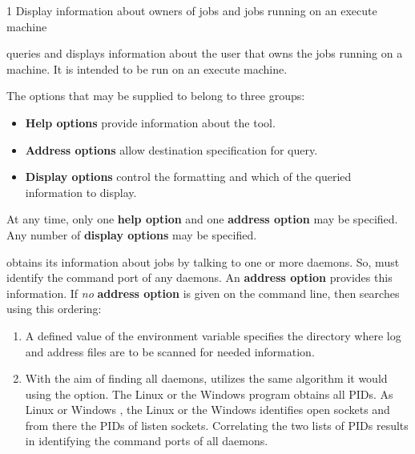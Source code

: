 \begin{ManPage}{\label{man-condor-who}}{1}
{Display information about owners of jobs and jobs running on an execute machine}

\Synopsis {}

\Description
{} queries and displays information about the user that
owns the jobs running on a machine.
It is intended to be run on an execute machine.

The options that may be supplied to  belong to three groups:
\begin{itemize}
  \item \textbf{Help options} provide information about the 
  tool.
  \item \textbf{Address options} allow destination specification for query.
  \item \textbf{Display options} control the formatting and which of the 
  queried information to display.
\end{itemize}

At any time, only one \textbf{help option} and one \textbf{address option}
may be specified.  
Any number of \textbf{display options} may be specified.

 obtains its information about jobs by talking to 
one or more  daemons.
So,  must identify the command port of any 
daemons.
An \textbf{address option} provides this information.
If \emph{no} \textbf{address option} is given on the command line,
then  searches using this ordering:
\begin{enumerate}
  \item A defined value of the environment variable 
  specifies the directory where log and address files are to be scanned
  for needed information.
  \item With the aim of finding all  daemons,
   utilizes the same algorithm it would using the
   option.
  The Linux  or the Windows 
  program obtains all PIDs.
  As Linux  or Windows ,
  the Linux  or the Windows  identifies open
  sockets and from there the PIDs of listen sockets.
  Correlating the two lists of PIDs results in identifying the command ports of
  all  daemons. 
\end{enumerate}



\end{ManPage}
